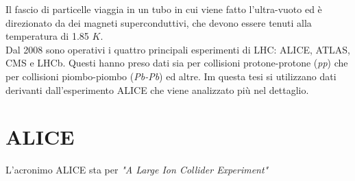 Il fascio di particelle viaggia in un tubo in cui viene fatto l'ultra-vuoto ed è direzionato da dei magneti superconduttivi, che devono essere tenuti alla temperatura di 1.85 $K$.
\\Dal 2008 sono operativi i quattro principali esperimenti di LHC: ALICE, ATLAS, CMS e LHCb. Questi hanno preso dati sia per collisioni protone-protone (\textit{pp}) che per collisioni piombo-piombo (\textit{Pb-Pb}) ed altre. Im questa tesi si utilizzano dati derivanti dall'esperimento ALICE che viene analizzato più nel dettaglio. 



\section{ALICE}

L'acronimo ALICE sta per \textit{"A Large Ion Collider Experiment"} 
    

    
   